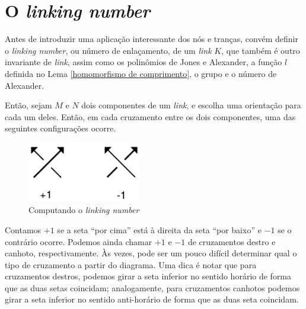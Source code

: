 \section{O \textit{linking number}}
	Antes de introduzir uma aplicação interessante dos nós e tranças, convém definir o \textit{linking number}, 
	ou número de enlaçamento, de um \textit{link} $K$, que também é outro invariante de \textit{link}, assim 
	como os polinômios de Jones e Alexander, a função $l$ definida no Lema \eqref{homomorfismo de comprimento}, 
	o grupo e o número de Alexander.  
	
	\par\vspace{0.3cm} Então, sejam $M$ e $N$ dois componentes de um \textit{link}, e escolha uma orientação 
	para cada um deles. Então, em cada cruzamento entre os dois componentes, uma das seguintes 
	configurações ocorre.
	\begin{figure}[H]
		\begin{center}
			\includegraphics[width=5cm]{Images/linking_number.png}
		\end{center}\caption{Computando o \textit{linking number}}\label{linking number}
	\end{figure}
	\par\vspace{0.3cm} Contamos $+1$ se a seta ``por cima'' está à direita da seta ``por baixo'' e 
	$-1$ se o contrário ocorre. Podemos ainda chamar $+1$ e $-1$ de cruzamentos destro e canhoto, respectivamente.
	Às vezes, pode ser um pouco difícil determinar qual o tipo de cruzamento a partir do diagrama. Uma dica é 
	notar que para cruzamentos destros, podemos girar a seta inferior no sentido horário de forma que as duas 
	setas coincidam; analogamente, para cruzamentos canhotos podemos girar a seta inferior no sentido 
	anti-horário de forma que as duas seta coincidam.
	
